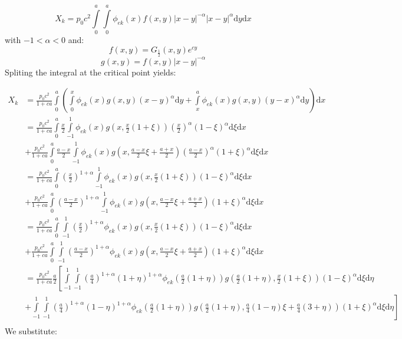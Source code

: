 \documentclass[12pt,letterpaper]{article}
\theoremstyle{definition}
\numberwithin{equation}{subsection}
\newcommand{\dd}{\text{d}}
\begin{document}
\begin{equation}
    X_{k} = p_0 c^2 \int\limits_0^a \int\limits_0^a \phi_{ek}(x) f(x, y) |x-y|^{-\alpha} |x-y|^{\alpha}\dd y\dd x
\end{equation}
with $-1<\alpha<0$ and:
\begin{equation}
    f(x,y) = G_{\frac{1}{2}}(x,y) e^{cy}
\end{equation}
\begin{equation}
    g(x,y) = f(x,y) |x-y|^{-\alpha}
\end{equation}
Spliting the integral at the critical point yields:

\begin{align*}
    X_{k} &= \frac{p_0 c^2}{1+ca} \int\limits_0^a \left( \int\limits_0^x \phi_{ek}(x) g(x,y) (x-y)^{\alpha}\dd y + \int\limits_x^a \phi_{ek}(x) g(x,y) (y-x)^{\alpha}\dd y\right) \dd x \\
    &= \frac{p_0 c^2}{1+ca} \int\limits_0^a \frac{x}{2} \int\limits_{-1}^{1}\phi_{ek}(x) g\left(x, \frac{x}{2}(1+ \xi) \right)\left(\frac{x}{2}\right)^{\alpha} (1-\xi)^{\alpha} \dd \xi \dd x \\
    &+ \frac{p_0 c^2}{1+ca} \int\limits_0^a \frac{a - x}{2} \int\limits_{-1}^{1}\phi_{ek}(x) g\left(x, \frac{a-x}{2}\xi + \frac{a+x}{2}\right)\left(\frac{a-x}{2}\right)^{\alpha} (1+\xi)^{\alpha} \dd \xi \dd x \\
    &= \frac{p_0 c^2}{1+ca} \int\limits_0^a \left(\frac{x}{2}\right)^{1+ \alpha} \int\limits_{-1}^{1}\phi_{ek}(x) g\left(x, \frac{x}{2}(1+ \xi) \right) (1-\xi)^{\alpha} \dd \xi \dd x \\
    &+ \frac{p_0 c^2}{1+ca} \int\limits_0^a \left(\frac{a-x}{2}\right)^{1+\alpha} \int\limits_{-1}^{1}\phi_{ek}(x) g\left(x, \frac{a-x}{2}\xi + \frac{a+x}{2}\right) (1+\xi)^{\alpha} \dd \xi \dd x \\
    &= \frac{p_0 c^2}{1+ca} \int\limits_0^a \int\limits_{-1}^{1}\left(\frac{x}{2}\right)^{1+ \alpha} \phi_{ek}(x) g\left(x, \frac{x}{2}(1+ \xi) \right) (1-\xi)^{\alpha} \dd \xi \dd x \\
    &+ \frac{p_0 c^2}{1+ca} \int\limits_0^a \int\limits_{-1}^{1}\left(\frac{a-x}{2}\right)^{1+\alpha} \phi_{ek}(x) g\left(x, \frac{a-x}{2}\xi + \frac{a+x}{2}\right) (1+\xi)^{\alpha} \dd \xi \dd x \\
    &= \frac{p_0 c^2}{1+ca} \frac{a}{2} \left[ \int\limits_{-1}^1 \int\limits_{-1}^{1} \left(\frac{a}{4}\right)^{1+ \alpha} (1+\eta)^{1+\alpha} \phi_{ek}\left(\frac{a}{2}(1+\eta)\right) g\left(\frac{a}{2}(1+\eta), \frac{x}{2}(1+ \xi) \right) (1-\xi)^{\alpha} \dd \xi \dd \eta \right.\\
    &+ \left. \int\limits_{-1}^1 \int\limits_{-1}^{1} \left(\frac{a}{4}\right)^{1+ \alpha} (1-\eta)^{1+\alpha} \phi_{ek}\left(\frac{a}{2}(1+\eta)\right) g\left(\frac{a}{2}(1+\eta), \frac{a}{4}(1-\eta)\xi + \frac{a}{4}(3+\eta)\right) (1+\xi)^{\alpha} \dd \xi \dd \eta \right]\\
\end{align*}
We substitute:
\end{document}
